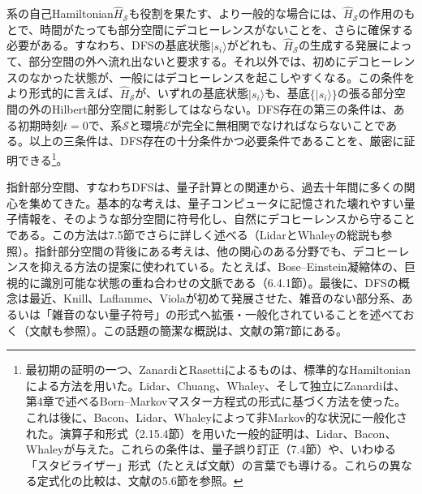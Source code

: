 系の自己Hamiltonian$\hat H_{\mathcal S}$も役割を果たす、より一般的な場合には、$\hat H_{\mathcal S}$の作用のもとで、時間がたっても部分空間にデコヒーレンスがないことを、さらに確保する必要がある。すなわち、DFSの基底状態$\lvert s_i\rangle$がどれも、$\hat H_{\mathcal S}$の生成する発展によって、部分空間の外へ流れ出ないと要求する。それ以外では、初めにデコヒーレンスのなかった状態が、一般にはデコヒーレンスを起こしやすくなる。この条件をより形式的に言えば、$\hat H_{\mathcal S}$が、いずれの基底状態$\lvert s_i\rangle$も、基底$\{\lvert s_i\rangle\}$の張る部分空間の外のHilbert部分空間に射影してはならない。DFS存在の第三の条件は、ある初期時刻$t=0$で、系$\mathcal S$と環境$\mathcal E$が完全に無相関でなければならないことである。以上の三条件は、DFS存在の十分条件かつ必要条件であることを、厳密に証明できる\footnote{最初期の証明の一つ、ZanardiとRasetti\cite{ref092}によるものは、標準的なHamiltonianによる方法を用いた。Lidar、Chuang、Whaley\cite{ref090}、そして独立にZanardi\cite{ref093}は、第4章で述べるBorn--Markovマスター方程式の形式に基づく方法を使った。これは後に、Bacon、Lidar、Whaley\cite{ref099}によって非Markov的な状況に一般化された。演算子和形式（2.15.4節）を用いた一般的証明は、Lidar、Bacon、Whaley\cite{ref094}が与えた。これらの条件は、量子誤り訂正（7.4節）や、いわゆる「スタビライザー」形式（たとえば文献\cite{ref100}）の言葉でも導ける。これらの異なる定式化の比較は、文献\cite{ref101}の5.6節を参照。}。

指針部分空間、すなわちDFSは、量子計算との関連から、過去十年間に多くの関心を集めてきた。基本的な考えは、量子コンピュータに記憶された壊れやすい量子情報を、そのような部分空間に符号化し、自然にデコヒーレンスから守ることである。この方法は7.5節でさらに詳しく述べる（LidarとWhaleyの総説\cite{ref101}も参照）。指針部分空間の背後にある考えは、他の関心のある分野でも、デコヒーレンスを抑える方法の提案に使われている。たとえば、Bose--Einstein凝縮体の、巨視的に識別可能な状態の重ね合わせの文脈である\cite{ref102}（6.4.1節）。最後に、DFSの概念は最近、Knill、Laflamme、Violaが初めて発展させた\cite{ref098}、雑音のない部分系、あるいは「雑音のない量子符号」の形式へ拡張・一般化されていることを述べておく（文献\cite{ref100}も参照）。この話題の簡潔な概説は、文献\cite{ref101}の第7節にある。
